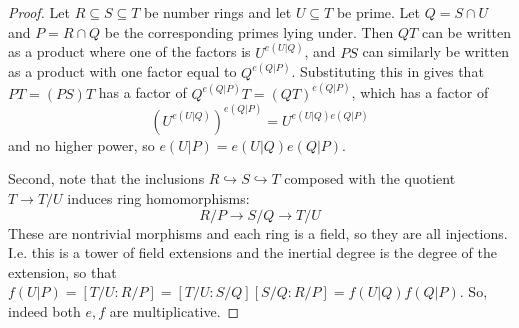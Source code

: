 \begin{proof}
	Let $R \subseteq S \subseteq T$ be number rings and let $U \subseteq T$ be prime. Let $Q = S \cap U$ and $P = R \cap Q$ be the corresponding primes lying under. Then $QT$ can be written as a product where one of the factors is $U^{e(U|Q)}$, and $PS$ can similarly be written as a product with one factor equal to $Q^{e(Q|P)}$. Substituting this in gives that $PT = (PS)T$ has a factor of $Q^{e(Q|P)}T = (QT)^{e(Q|P)}$, which has a factor of
	\[ (U^{e(U|Q)})^{e(Q|P)} = U^{e(U|Q)e(Q|P)} \]
	and no higher power, so $e(U|P) = e(U|Q)e(Q|P)$.
	
	Second, note that the inclusions $R \hookrightarrow S \hookrightarrow T$ composed with the quotient $T \to T/U$ induces ring homomorphisms:
	\[ R/P \to S/Q \to T/U \]
	These are nontrivial morphisms and each ring is a field, so they are all injections. I.e. this is a tower of field extensions and the inertial degree is the degree of the extension, so that $f(U|P) = [T/U : R/P] = [T/U : S/Q][S/Q : R/P] = f(U|Q)f(Q|P)$. So, indeed both $e,f$ are multiplicative.
\end{proof}
